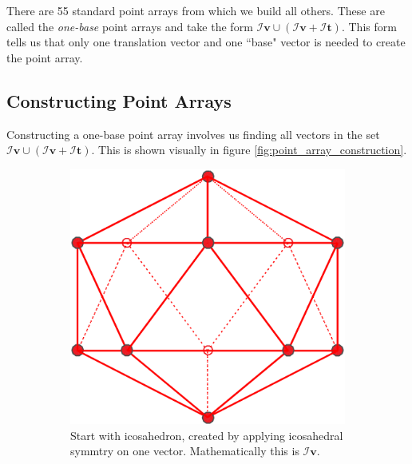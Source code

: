 \documentclass[a4paper,10pt]{article}
\theoremstyle{plain}
\theoremstyle{definition}
\theoremstyle{remark}
\renewcommand{\vec}[1]{\mathbf{#1}}
\begin{document}
There are 55 standard point arrays from which we build all others.
These are called the \emph{one-base} point arrays and take the form \(\mathcal{I}\vec{v} \cup (\mathcal{I}\vec{v} + \mathcal{I}\vec{t})\). This form tells us that only one translation vector and one ``base" vector is needed to create the point array. \cite{keeftwarock2009affine}

\subsection{Constructing Point Arrays}
Constructing a one-base point array involves us finding all vectors in the set \(\mathcal{I}\vec{v} \cup (\mathcal{I}\vec{v} + \mathcal{I}\vec{t})\).
This is shown visually in figure \ref{fig:point_array_construction}.

\begin{figure}[h!]
	\centering
	\begin{subfigure}{0.25\textwidth}
		\centering
		\includegraphics[width=\textwidth]{images/p_arr_construction_1.pdf}
		\caption{Start with icosahedron, created by applying icosahedral symmtry on one vector. Mathematically this is \(\mathcal{I}\vec{v}\).}
	\end{subfigure}
	\hfill
	\begin{subfigure}{0.3\textwidth}
		\centering

\end{subfigure}
\end{figure}
\end{document}
